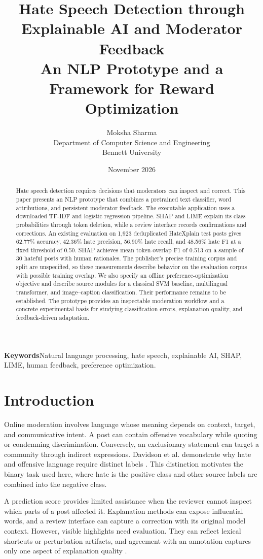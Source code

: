\documentclass[11pt,a4paper]{article}
\title{Hate Speech Detection through Explainable AI and Moderator Feedback\\[4pt]
\large An NLP Prototype and a Framework for Reward Optimization}
\author{Moksha Sharma\\Department of Computer Science and Engineering\\Bennett University}
\date{November 2026}
\begin{document}
\maketitle
\begin{abstract}
Hate speech detection requires decisions that moderators can inspect and correct.
This paper presents an NLP prototype that combines a pretrained text classifier,
word attributions, and persistent moderator feedback. The executable application
uses a downloaded TF-IDF and logistic regression pipeline. SHAP and LIME explain
its class probabilities through token deletion, while a review interface records
confirmations and corrections. An existing evaluation on 1,923 deduplicated
HateXplain test posts gives 62.77\% accuracy, 42.36\% hate precision, 56.90\% hate
recall, and 48.56\% hate F1 at a fixed threshold of 0.50. SHAP achieves mean
token-overlap F1 of 0.513 on a sample of 30 hateful posts with human rationales.
The publisher's precise training corpus and split are unspecified, so these
measurements describe behavior on the evaluation corpus with possible training
overlap. We also specify an offline preference-optimization objective and
describe source modules for a classical SVM baseline, multilingual transformer,
and image--caption classification. Their performance remains to be established.
The prototype provides an inspectable moderation workflow and a concrete
experimental basis for studying classification errors, explanation quality,
and feedback-driven adaptation.
\end{abstract}
\noindent\textbf{Keywords}\quad Natural language processing, hate speech,
explainable AI, SHAP, LIME, human feedback, preference optimization.

\section{Introduction}
Online moderation involves language whose meaning depends on context, target,
and communicative intent. A post can contain offensive vocabulary while quoting
or condemning discrimination. Conversely, an exclusionary statement can target
a community through indirect expressions. Davidson et al. demonstrate why hate
and offensive language require distinct labels \cite{davidson}. This distinction
motivates the binary task used here, where hate is the positive class and other
source labels are combined into the negative class.

A prediction score provides limited assistance when the reviewer cannot inspect
which parts of a post affected it. Explanation methods can expose influential
words, and a review interface can capture a correction with its original model
context. However, visible highlights need evaluation. They can reflect lexical
shortcuts or perturbation artifacts, and agreement with an annotation captures
only one aspect of explanation quality \cite{eraser}.
\end{document}
